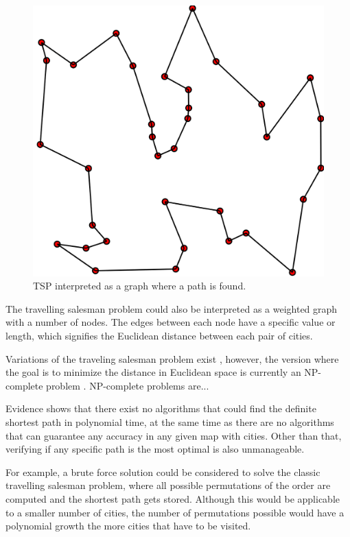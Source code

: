 \documentclass{article}
\begin{document}
\begin{figure}[ht]
 \centering
 \includegraphics[scale=.15]{docs/pictures/tsp.png}
 \caption{TSP interpreted as a graph where a path is found. \cite{wiki:TSP}}
 \label{Figure:TSP-as-graph}
\end{figure}


The travelling salesman problem could also be interpreted as a weighted graph with a number of nodes. The edges between each node have a specific value or length, which signifies the Euclidean distance between each pair of cities. 

Variations of the traveling salesman problem exist \cite{gutin_punnen_2007}, however, the version where the goal is to minimize the distance in Euclidean space is currently an NP-complete problem \cite{PAPADIMITRIOU1977}. NP-complete problems are...

Evidence shows that there exist no algorithms that could find the definite shortest path in polynomial time, at the same time as there are no algorithms that can guarantee any accuracy in any given map with cities. Other than that, verifying if any specific path is the most optimal is also unmanageable. \cite{PAPADIMITRIOU1977}

For example, a brute force solution could be considered to solve the classic travelling salesman problem, where all possible permutations of the order are computed and the shortest path gets stored. Although this would be applicable to a smaller number of cities, the number of permutations possible would have a polynomial growth the more cities that have to be visited. 
\end{document}

